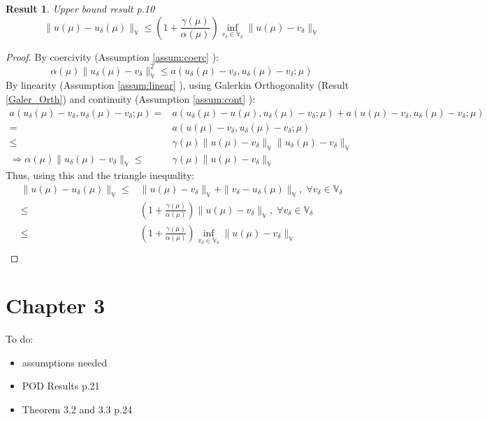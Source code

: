 \documentclass{article}
\newtheorem{result}{Result}
\begin{document}
\begin{result}{Upper bound result p.10}
$$ \| u(\mu )-u_\delta (\mu )\| _\mathbb{V}  \leq \left( 1+\frac{\gamma (\mu )}{\alpha (\mu )} \right) \inf _{v_\delta  \in \mathbb{V}_\delta }\| u(\mu )-v_\delta \| _\mathbb{V} $$
\end{result}

\begin{proof}
By coercivity (Assumption \ref{assum:coerc} ):
$$\alpha (\mu )\| u_ \delta (\mu )-v_\delta \|_\mathbb{V}^2 \leq a(u_ \delta (\mu )-v_\delta ,u_ \delta (\mu )-v_\delta ;\mu ) $$
By linearity (Assumption \ref{assum:linear} ), using Galerkin Orthogonality (Result \ref{Galer_Orth}) and continuity (Assumption \ref{assum:cont} ):
\begin{align*}
a(u_ \delta (\mu )-v_\delta ,u_ \delta (\mu )-v_\delta ;\mu )=&a(u_ \delta (\mu )-u(\mu ) ,u_ \delta (\mu )-v_\delta ;\mu )+a(u(\mu )-v_\delta ,u_ \delta (\mu )-v_\delta ;\mu )\\
=&a(u(\mu )-v_\delta ,u_ \delta (\mu )-v_\delta ;\mu )\\
\leq &\gamma(\mu )\| u(\mu )-v_\delta \|_\mathbb{V} \| u_ \delta (\mu )-v_\delta \|_\mathbb{V}\\
\Rightarrow \alpha (\mu )\| u_ \delta (\mu )-v_\delta \| _\mathbb{V} \leq& \gamma(\mu )\| u(\mu )-v_\delta \|_\mathbb{V}
\end{align*}
Thus, using this and the triangle inequality:
\begin{align*}
\| u(\mu )-u_\delta (\mu )\| _\mathbb{V}  \leq &\| u(\mu )-v_\delta \| _\mathbb{V} + \| v_\delta -u_\delta (\mu )\| _\mathbb{V},\; \forall v_\delta \in \mathbb{V}_\delta \\
\leq &\left ( 1+\frac{\gamma (\mu )}{\alpha(\mu )}\right )\| u(\mu )-v_\delta \| _\mathbb{V},\; \forall v_\delta \in \mathbb{V}_\delta \\
\leq &\left ( 1+\frac{\gamma (\mu )}{\alpha(\mu )}\right )\inf_{v_\delta \in \mathbb{V}_\delta }\| u(\mu )-v_\delta \| _\mathbb{V}\\
\end{align*}

\end{proof}

\section*{Chapter 3}

To do:
\begin{itemize}
\item assumptions needed\\
\item POD Results p.21\\
\item Theorem 3.2 and 3.3 p.24\\
\end{itemize}
\end{document}
